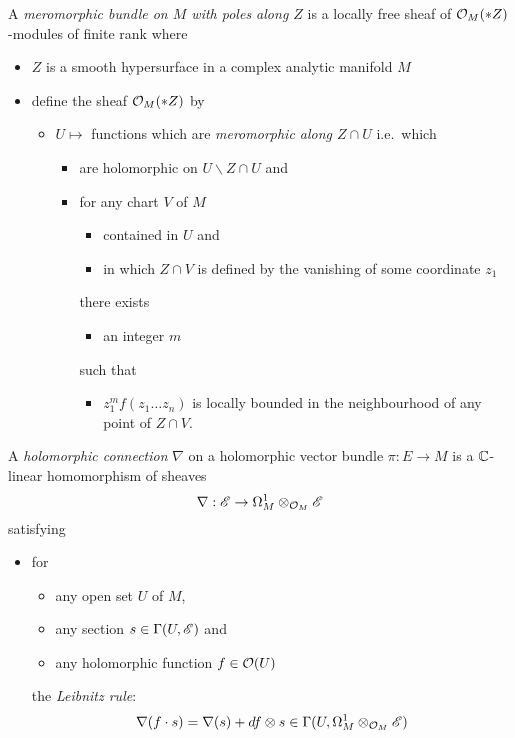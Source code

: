 \begin{defn}
  A \emph{meromorphic bundle on $M$ with poles along $Z$} is a locally free
  sheaf of $\mathcal{O}_M(*Z)$-modules of finite rank
  where 
  \begin{itemize}
    \item $Z$ is a smooth hypersurface in a complex analytic manifold $M$
    \item define the sheaf $\mathcal{O}_M(*Z)$ by
      \begin{itemize}
        \item $U\mapsto$ functions which are \emph{meromorphic along $Z\cap U$}
          i.e.\ which
          \begin{itemize}
            \item are holomorphic on $U\backslash Z\cap U$ and
            \item for any chart $V$ of $M$
              \begin{itemize}
                \item contained in $U$ and
                \item in which $Z\cap V$ is defined by the vanishing of some
                  coordinate $z_1$
              \end{itemize}
              there exists
              \begin{itemize}
                \item an integer $m$
              \end{itemize}
              such that 
              \begin{itemize}
                \item $z_1^mf(z_1\dots z_n)$ is locally bounded in the
                  neighbourhood of any point of $Z\cap V$.
              \end{itemize}
          \end{itemize}
      \end{itemize}
  \end{itemize}
\end{defn}
\begin{defn}
  A \emph{holomorphic connection} $\nabla$ on a holomorphic vector bundle
  $\pi:E\to M$ is a $\mathbb{C}$-linear homomorphism of sheaves
  \[
    \nabla:\mathscr{E}\to\Omega_M^1\otimes_{\mathcal{O}_M}\mathscr{E}
  \]
  satisfying
  \begin{itemize}
    \item for
      \begin{itemize}
        \item any open set $U$ of $M$,
        \item any section $s\in\Gamma(U,\mathscr{E})$ and
        \item any holomorphic function $f\in\mathcal{O}(U)$
      \end{itemize}
      the \emph{Leibnitz rule}:
      \[
        \nabla(f\cdot s)=\nabla(s)+df\otimes
        s\in\Gamma(U,\Omega_M^1\otimes_{\mathcal{O}_M}\mathscr{E})
      \]
  \end{itemize}
\end{defn}

